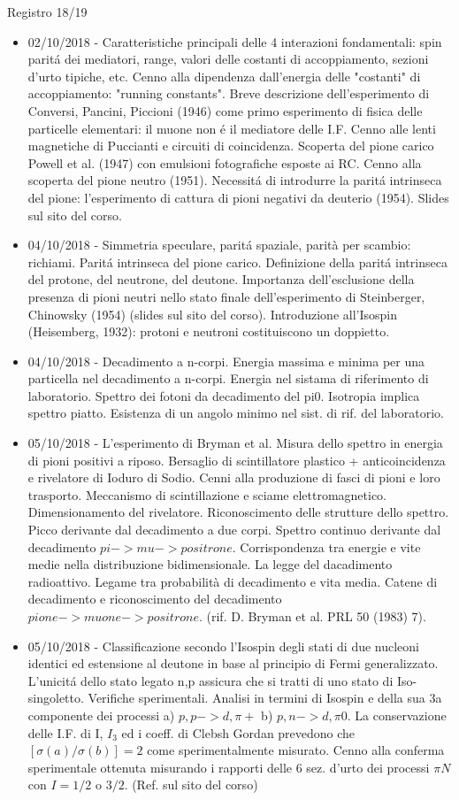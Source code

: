\begin{frame}[allowframebreaks]{Registro 18/19}
\begin{itemize}
\item 02/10/2018 - Caratteristiche principali delle 4 interazioni fondamentali: spin parit\'a dei mediatori, range, valori delle costanti di accoppiamento, sezioni d'urto tipiche, etc. Cenno alla dipendenza dall'energia delle "costanti" di accoppiamento: "running constants". Breve descrizione dell'esperimento di Conversi, Pancini, Piccioni (1946) come primo esperimento di fisica delle particelle elementari: il muone non \'e il mediatore delle I.F. Cenno alle lenti magnetiche di Puccianti e circuiti di coincidenza. Scoperta del pione carico Powell et al. (1947) con emulsioni fotografiche esposte ai RC. Cenno alla scoperta del pione neutro (1951). Necessit\'a di introdurre la parit\'a intrinseca del pione: l'esperimento di cattura di pioni negativi da deuterio (1954). Slides sul sito del corso.
\item 04/10/2018 - Simmetria speculare, parit\'a spaziale, parità per scambio: richiami. Parit\'a intrinseca del pione carico. Definizione della parit\'a intrinseca del protone, del neutrone, del deutone. Importanza dell'esclusione della presenza di pioni neutri nello stato finale dell'esperimento di Steinberger, Chinowsky (1954) (slides sul sito del corso). Introduzione all'Isospin (Heisemberg, 1932): protoni e neutroni costituiscono un doppietto.
\item 04/10/2018 - Decadimento a n-corpi. Energia massima e minima per una particella nel decadimento a n-corpi. Energia nel sistama di riferimento di laboratorio. Spettro dei fotoni da decadimento del pi0. Isotropia implica spettro piatto. Esistenza di un angolo minimo nel sist. di rif. del laboratorio.
\item 05/10/2018 - L'esperimento di Bryman et al. Misura dello spettro in energia di pioni positivi a riposo. Bersaglio di scintillatore plastico + anticoincidenza e rivelatore di Ioduro di Sodio. Cenni alla produzione di fasci di pioni e loro trasporto. Meccanismo di scintillazione e sciame elettromagnetico. Dimensionamento del rivelatore. Riconoscimento delle strutture dello spettro. Picco derivante dal decadimento a due corpi. Spettro continuo derivante dal decadimento $pi -> mu -> positrone$. Corrispondenza tra energie e vite medie nella distribuzione bidimensionale. La legge del dacadimento radioattivo. Legame tra probabilità di decadimento e vita media. Catene di decadimento e riconoscimento del decadimento $pione->muone->positrone$. (rif. D. Bryman et al. PRL 50 (1983) 7).
\item 05/10/2018 - Classificazione secondo l'Isospin degli stati di due nucleoni identici ed estensione al deutone in base al principio di Fermi generalizzato. L'unicit\'a dello stato legato n,p assicura che si tratti di uno stato di Iso-singoletto. Verifiche sperimentali. Analisi in termini di Isospin e della sua 3a componente dei processi a) $p,p->d,\pi+$ b) $p,n-> d,\pi0$. La conservazione delle I.F. di I, $I_3$ ed i coeff. di Clebsh Gordan prevedono che $[\sigma(a)/\sigma(b)]=2$ come sperimentalmente misurato. Cenno alla conferma sperimentale ottenuta misurando i rapporti delle 6 sez. d'urto dei processi $\pi N$ con $I=1/2$ o $3/2$. (Ref. sul sito del corso)

\end{itemize}
\end{frame}
